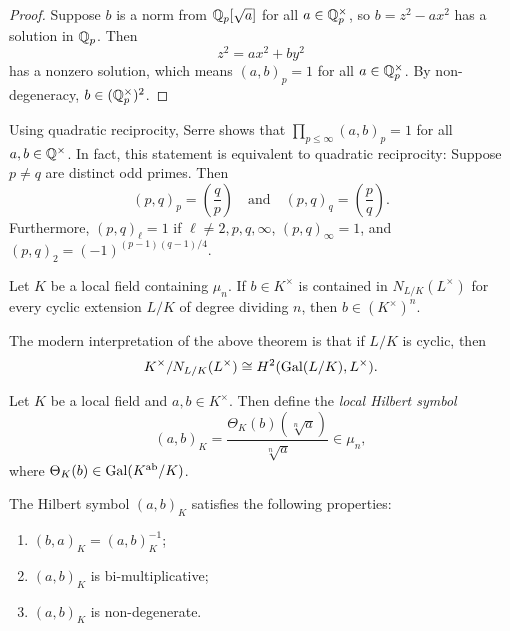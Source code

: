 \begin{proof}
  Suppose $b$ is a norm from
  $\mathbb{Q}_p[\sqrt{a}]$ for all
  $a \in \mathbb{Q}_p^\times$, so
  $b = z^2 - ax^2$ has a solution in $\mathbb{Q}_p$.
  Then
  \[
    z^2 = ax^2 + by^2
  \]
  has a nonzero solution, which means
  $(a, b)_p = 1$ for all $a \in \mathbb{Q}_p^\times$.
  By non-degeneracy, $b \in (\mathbb{Q}_p^\times)^2$.
\end{proof}

\begin{remark}
  Using quadratic reciprocity, Serre
  shows that $\prod_{p \le \infty} (a, b)_p = 1$
  for all $a, b \in \mathbb{Q}^\times$. In fact,
  this statement is equivalent to
  quadratic reciprocity: Suppose
  $p \ne q$ are distinct odd primes. Then
  \[
    (p, q)_p = \left(\frac{q}{p}\right)
    \quad \text{and} \quad
    (p, q)_q = \left(\frac{p}{q}\right).
  \]
  Furthermore, $(p, q)_\ell = 1$ if
  $\ell \ne 2, p, q, \infty$,
  $(p, q)_\infty = 1$, and $(p, q)_2 = (-1)^{(p - 1)(q - 1) / 4}$.
\end{remark}

\begin{theorem}
  Let $K$ be a local field containing
  $\mu_n$. If $b \in K^\times$ is
  contained in $N_{L / K}(L^\times)$ for
  every
  cyclic extension $L / K$ of degree
  dividing $n$, then $b \in (K^\times)^n$.
\end{theorem}

\begin{remark}
  The modern interpretation of the
  above theorem is that if $L / K$ is
  cyclic, then
  \[
    K^\times / N_{L / K}(L^\times) \cong
    H^2(\operatorname{Gal}(L / K), L^\times).
  \]
\end{remark}

\begin{definition}
  Let $K$ be a local field and
  $a, b \in K^\times$. Then define the
  \emph{local Hilbert symbol}
  \[
    (a, b)_K = \frac{\Theta_K(b)(\sqrt[n]{a})}{\sqrt[n]{a}} \in \mu_n,
  \]
  where $\Theta_K(b) \in \operatorname{Gal}(K^\mathrm{ab} / K)$.
\end{definition}

\begin{theorem}
  The Hilbert symbol $(a, b)_K$
  satisfies the
  following properties:
  \begin{enumerate}
    \item $(b, a)_K = (a, b)_K^{-1}$;
    \item $(a, b)_K$ is bi-multiplicative;
    \item $(a, b)_K$ is non-degenerate.
  \end{enumerate}
\end{theorem}

